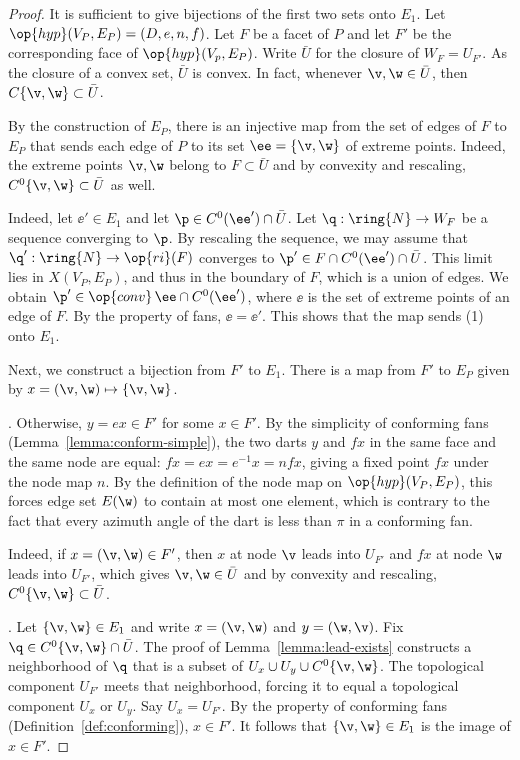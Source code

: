 \begin{proof}
  It is sufficient to give bijections of the first two sets onto
  $E_1$.  Let $\op{hyp}(V_P,E_P) = (D,e,n,f)$.  Let $F$ be a facet of
  $P$ and let $F'$ be the corresponding face of
  $\op{hyp}(V_p,E_P)$. Write $\bar U$ for the closure of
  $W_{F}=U_{F'}$.  As the closure of a convex set, $\bar U$ is convex.
  In fact, whenever $\v,\w\in \bar U$, then $C\{\v,\w\}\subset \bar
  U$.

  By the construction of $E_P$, there is an injective map from the set
  of edges of $F$ to $E_P$ that sends each edge of $P$ to its set
  $\ee =\{\v,\w\}$ of extreme points.    Indeed, the extreme points 
  $\v,\w$ belong to $F\subset\bar U$ and by convexity and rescaling,
  $C^0\{\v,\w\}\subset\bar U$ as well.

    Indeed, let
  $\ee'\in E_1$ and let $\p\in C^0(\ee')\cap\bar U$.  Let
  $\q:\ring{N}\to W_{F}$ be a sequence converging to $\p$.  By
  rescaling the sequence, we may assume that $\q':\ring{N}\to
  \op{ri}(F)$ converges to $\p' \in F \cap C^0(\ee')\cap \bar U$.
  This limit lies in $X(V_P,E_P)$, and thus in the boundary of $F$,
  which is a union of edges.  We obtain $\p' \in\op{conv}\,\ee\cap
  C^0(\ee')$, where $\ee$ is the set of extreme points of an edge of
  $F$.  By the {} property of fans, $\ee = \ee'$.
  This shows that the map sends (1) onto $E_1$.

  Next, we construct a bijection from $F'$ to $E_1$.  There is a map
  from $F'$ to $E_P$ given by $x = (\v,\w) \mapsto \{\v,\w\}$. 

  .  Otherwise, $y = e x\in F'$ for some
  $x\in F'$.  By the simplicity of conforming fans
  (Lemma~\ref{lemma:conform-simple}), the two darts $y$ and $f x$ in
  the same face and the same node are equal: $f x = e x = e^{-1} x = n
  f x$, giving a fixed point $f x$ under the node map $n$.  By the
  definition of the node map on $\op{hyp}(V_P,E_P)$, this forces edge
  set $E(\w)$ to contain at most one element, which is contrary to the
  fact that every azimuth angle of the dart is less than $\pi$ in a
  conforming fan.

    Indeed, if $x=(\v,\w)\in F'$,
  then $x$ at node $\v$ leads into $U_{F'}$ and $f x$ at node $\w$ leads
  into $U_{F'}$, which gives $\v,\w\in \bar U$ and by convexity and rescaling, 
  $C^0\{\v,\w\}\subset \bar U$.

  .
  Let $\{\v,\w\}\in E_1$ and write $x = (\v,\w)$ and $y = (\w,\v)$.
  Fix $\q\in C^0\{\v,\w\}\cap \bar U$.  The proof of
  Lemma~\ref{lemma:lead-exists} constructs a neighborhood of $\q$ that
  is a subset of $U_x\cup U_y\cup C^0\{\v,\w\}$.  The topological
  component $U_{F'}$ meets that neighborhood, forcing it to equal a
  topological component $U_x$ or $U_y$.  Say $U_x = U_{F'}$.  By the
  property  of conforming fans
  (Definition~\ref{def:conforming}), $x\in F'$. It follows that
  $\{\v,\w\}\in E_1$ is the image of $x\in F'$.
\end{proof}



